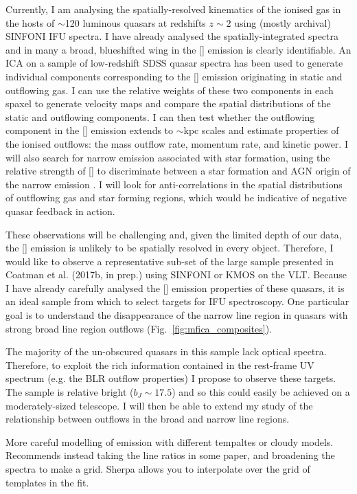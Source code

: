 Currently, I am analysing the spatially-resolved kinematics of the ionised gas in the hosts of $\sim$120 luminous quasars at redshifts $z\sim2$ using (mostly archival) SINFONI IFU spectra. 
I have already analysed the spatially-integrated spectra and in many a broad, blueshifted wing in the [] emission is clearly identifiable. 
An ICA on a sample of low-redshift SDSS quasar spectra has been used to generate individual components corresponding to the [] emission originating in static and outflowing gas. 
I can use the relative weights of these two components in each spaxel to generate velocity maps and compare the spatial distributions of the static and outflowing components.
I can then test whether the outflowing component in the [] emission extends to $\sim$kpc scales and
estimate properties of the ionised outflows: the mass outflow rate, momentum rate, and kinetic power.
I will also search for narrow \ha emission associated with star formation, using the relative strength of [] to discriminate between a star formation and AGN origin of the narrow \ha emission \citep{susie16}. 
I will look for anti-correlations in the spatial distributions of outflowing gas and star forming regions, which would be indicative of negative quasar feedback in action.

These observations will be challenging and, given the limited depth of our data, the [] emission is unlikely to be spatially resolved in every object. 
Therefore, I would like to observe a representative sub-set of the large sample presented in Coatman et al. (2017b, in prep.) using SINFONI or KMOS on the VLT. 
Because I have already carefully analysed the [] emission properties of these quasars, it is an ideal sample from which to select targets for IFU spectroscopy. 
One particular goal is to understand the disappearance of the narrow line region in quasars with strong broad line region outflows (Fig.~\ref{fig:mfica_composites}). 

The majority of the un-obscured quasars in this sample lack optical spectra. 
Therefore, to exploit the rich information contained in the rest-frame UV spectrum (e.g. the BLR outflow properties) I propose to observe these targets. 
The sample is relative bright ($b_J\sim17.5$) and so this could easily be achieved on a moderately-sized telescope. 
I will then be able to extend my study of the relationship between outflows in the broad and narrow line regions. 


More careful modelling of  emission with different tempaltes or cloudy models. 
 Recommends instead taking the line ratios in some paper, and broadening the spectra to make a grid. Sherpa allows you to interpolate over the grid of templates in the fit. 
